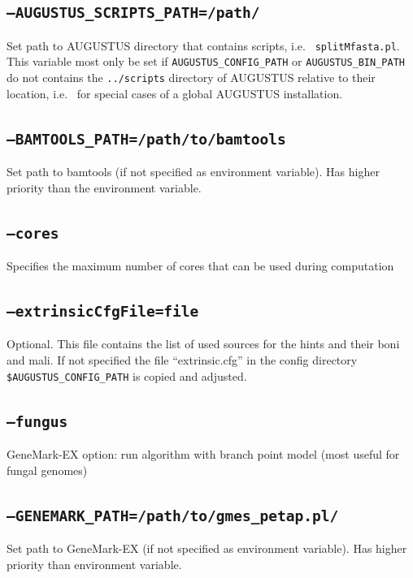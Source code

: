 \documentclass[a4paper,10pt]{report}
\begin{document}
\subsection{\texttt{--AUGUSTUS\_SCRIPTS\_PATH=/path/}}       Set path to AUGUSTUS directory that contains scripts, i.e.~
    				         \texttt{splitMfasta.pl}. This variable most only be set if
    				         \texttt{AUGUSTUS\_CONFIG\_PATH} or \texttt{AUGUSTUS\_BIN\_PATH} do not contains the
    				         \texttt{../scripts} directory of AUGUSTUS relative to their location, i.e.~
    				         for special cases of a global AUGUSTUS installation.
    				         
\subsection{\texttt{--BAMTOOLS\_PATH=/path/to/bamtools}}
Set path to bamtools (if not specified as environment 
variable). Has higher priority than the environment variable.
\subsection{\texttt{--cores}}                              Specifies the maximum number of cores that can be used during 
                                         computation
\subsection{\texttt{--extrinsicCfgFile=file}}              Optional. This file contains the list of used sources for the 
                                         hints and their boni and mali. If not specified the file ``extrinsic.cfg'' 
                                         in the config directory \texttt{\$AUGUSTUS\_CONFIG\_PATH} is copied and adjusted.
\subsection{\texttt{--fungus}}                             GeneMark-EX option: run algorithm with branch point model (most 
                                         useful for fungal genomes)
\subsection{\texttt{--GENEMARK\_PATH=/path/to/gmes\_petap.pl/}}            

Set path to GeneMark-EX (if not specified as environment variable). Has higher priority than environment variable.
\end{document}
